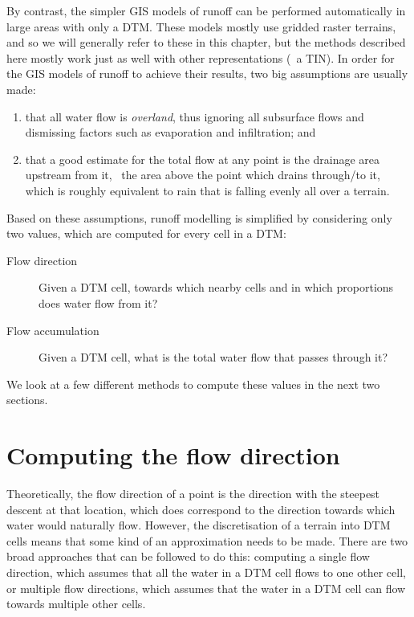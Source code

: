 By contrast, the simpler GIS models of runoff can be performed automatically in large areas with only a DTM\@.
These models mostly use gridded raster terrains, and so we will generally refer to these in this chapter, but the methods described here mostly work just as well with other representations (\eg\ a TIN).
In order for the GIS models of runoff to achieve their results, two big assumptions are usually made:

\begin{enumerate}
\item that all water flow is \emph{overland}, thus ignoring all subsurface flows and dismissing factors such as evaporation and infiltration; and
\item that a good estimate for the total flow at any point is the drainage area upstream from it, \ie\ the area above the point which drains through/to it, which is roughly equivalent to rain that is falling evenly all over a terrain.
\end{enumerate}

Based on these assumptions, runoff modelling is simplified by considering only two values, which are computed for every cell in a DTM\@:

\begin{description}
\item[Flow direction]
Given a DTM cell, towards which nearby cells and in which proportions does water flow from it?
\item[Flow accumulation]
Given a DTM cell, what is the total water flow that passes through it?
\end{description}

We look at a few different methods to compute these values in the next two sections.

\section{Computing the flow direction}%
\label{se:direction}

Theoretically, the flow direction of a point is the direction with the steepest descent at that location, which does correspond to the direction towards which water would naturally flow.
However, the discretisation of a terrain into DTM cells means that some kind of an approximation needs to be made.
There are two broad approaches that can be followed to do this: computing a single flow direction, which assumes that all the water in a DTM cell flows to one other cell, or multiple flow directions, which assumes that the water in a DTM cell can flow towards multiple other cells.

